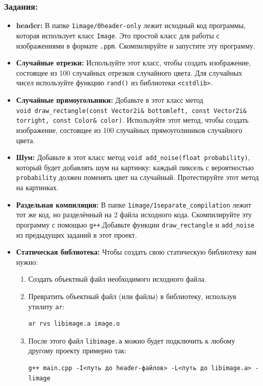 \documentclass{article}
\begin{document}
\subsubsection*{Задания:}
\begin{itemize}
\item \textbf{header:} В папке \texttt{1image/0header-only} лежит исходный код программы, которая использует класс \texttt{Image}. Это простой класс для работы с изображениями в формате \texttt{.ppm}. Скомпилируйте и запустите эту программу.
\item \textbf{Случайные отрезки:} Используйте этот класс, чтобы создать изображение, состоящее из 100 случайных отрезков случайного цвета. Для случайных чисел используйте функцию \texttt{rand()} из библиотеки \texttt{<cstdlib>}.
\item \textbf{Случайные прямоугольники:} Добавьте в этот класс метод \\
\texttt{void draw\_rectangle(const Vector2i\& bottomleft, const Vector2i\& torright, const Color\& color)}. Используйте этот метод, чтобы создать изображение, состоящее из 100 случайных прямоуголиников случайного цвета.
\item \textbf{Шум:} Добавьте в этот класс метод \texttt{void add\_noise(float probability)}, который будет добавлять шум на картинку: каждый пиксель с вероятностью \texttt{probability} должен поменять цвет на случайный. Протестируйте этот метод на картинках.
\item \textbf{Раздельная компиляция:} В папке \texttt{1image/1separate\_compilation} лежит тот же код, но разделённый на 2 файла исходного кода. Скомпилируйте эту программу с помощью \texttt{g++}.Добавьте функции \texttt{draw\_rectangle} и \texttt{add\_noise} из предыдущих заданий в этот проект.
\item \textbf{Статическая библиотека:} Чтобы создать свою статическую библиотеку вам нужно:
\begin{enumerate}
\item Создать объектный файл необходимого исходного файла.
\item Превратить объектный файл (или файлы) в библиотеку, используя утилиту \texttt{ar}:
\begin{verbatim}
ar rvs libimage.a image.o
\end{verbatim}
\item После этого файл \texttt{libimage.a} можно будет подключить к любому другому проекту примерно так:
\begin{verbatim}
g++ main.cpp -I<путь до header-файлов> -L<путь до libimage.a> -limage

\end{verbatim}
\end{enumerate}
\end{itemize}
\end{document}
